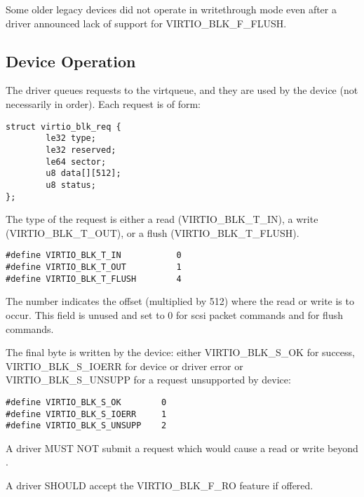 Some older legacy devices did not operate in writethrough mode even
after a driver announced lack of support for VIRTIO_BLK_F_FLUSH.

\subsection{Device Operation}\label{sec:Device Types / Block Device / Device Operation}

The driver queues requests to the virtqueue, and they are used by
the device (not necessarily in order). Each request is of form:

\begin{lstlisting}
struct virtio_blk_req {
        le32 type;
        le32 reserved;
        le64 sector;
        u8 data[][512];
        u8 status;
};
\end{lstlisting}

The type of the request is either a read (VIRTIO_BLK_T_IN), a write
(VIRTIO_BLK_T_OUT), or a flush (VIRTIO_BLK_T_FLUSH).

\begin{lstlisting}
#define VIRTIO_BLK_T_IN           0
#define VIRTIO_BLK_T_OUT          1
#define VIRTIO_BLK_T_FLUSH        4
\end{lstlisting}

The  number indicates the offset (multiplied by 512) where
the read or write is to occur. This field is unused and set to 0
for scsi packet commands and for flush commands.

The final  byte is written by the device: either
VIRTIO_BLK_S_OK for success, VIRTIO_BLK_S_IOERR for device or driver
error or VIRTIO_BLK_S_UNSUPP for a request unsupported by device:

\begin{lstlisting}
#define VIRTIO_BLK_S_OK        0
#define VIRTIO_BLK_S_IOERR     1
#define VIRTIO_BLK_S_UNSUPP    2
\end{lstlisting}


A driver MUST NOT submit a request which would cause a read or write
beyond .

A driver SHOULD accept the VIRTIO_BLK_F_RO feature if offered.

